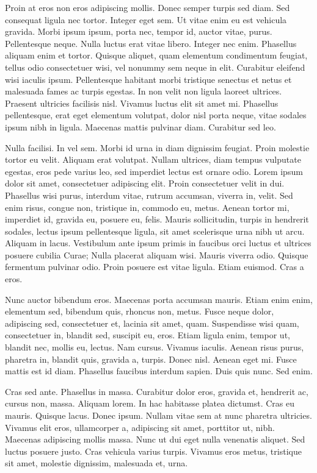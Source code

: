 Proin at eros non eros adipiscing mollis. Donec semper turpis sed diam. Sed consequat ligula nec tortor. Integer eget sem. Ut vitae enim eu est vehicula gravida. Morbi ipsum ipsum, porta nec, tempor id, auctor vitae, purus. Pellentesque neque. Nulla luctus erat vitae libero. Integer nec enim. Phasellus aliquam enim et tortor. Quisque aliquet, quam elementum condimentum feugiat, tellus odio consectetuer wisi, vel nonummy sem neque in elit. Curabitur eleifend wisi iaculis ipsum. Pellentesque habitant morbi tristique senectus et netus et malesuada fames ac turpis egestas. In non velit non ligula laoreet ultrices. Praesent ultricies facilisis nisl. Vivamus luctus elit sit amet mi. Phasellus pellentesque, erat eget elementum volutpat, dolor nisl porta neque, vitae sodales ipsum nibh in ligula. Maecenas mattis pulvinar diam. Curabitur sed leo.

Nulla facilisi. In vel sem. Morbi id urna in diam dignissim feugiat. Proin molestie tortor eu velit. Aliquam erat volutpat. Nullam ultrices, diam tempus vulputate egestas, eros pede varius leo, sed imperdiet lectus est ornare odio. Lorem ipsum dolor sit amet, consectetuer adipiscing elit. Proin consectetuer velit in dui. Phasellus wisi purus, interdum vitae, rutrum accumsan, viverra in, velit. Sed enim risus, congue non, tristique in, commodo eu, metus. Aenean tortor mi, imperdiet id, gravida eu, posuere eu, felis. Mauris sollicitudin, turpis in hendrerit sodales, lectus ipsum pellentesque ligula, sit amet scelerisque urna nibh ut arcu. Aliquam in lacus. Vestibulum ante ipsum primis in faucibus orci luctus et ultrices posuere cubilia Curae; Nulla placerat aliquam wisi. Mauris viverra odio. Quisque fermentum pulvinar odio. Proin posuere est vitae ligula. Etiam euismod. Cras a eros.

Nunc auctor bibendum eros. Maecenas porta accumsan mauris. Etiam enim enim, elementum sed, bibendum quis, rhoncus non, metus. Fusce neque dolor, adipiscing sed, consectetuer et, lacinia sit amet, quam. Suspendisse wisi quam, consectetuer in, blandit sed, suscipit eu, eros. Etiam ligula enim, tempor ut, blandit nec, mollis eu, lectus. Nam cursus. Vivamus iaculis. Aenean risus purus, pharetra in, blandit quis, gravida a, turpis. Donec nisl. Aenean eget mi. Fusce mattis est id diam. Phasellus faucibus interdum sapien. Duis quis nunc. Sed enim.


Cras sed ante. Phasellus in massa. Curabitur dolor eros, gravida et, hendrerit ac, cursus non, massa. Aliquam lorem. In hac habitasse platea dictumst. Cras eu mauris. Quisque lacus. Donec ipsum. Nullam vitae sem at nunc pharetra ultricies. Vivamus elit eros, ullamcorper a, adipiscing sit amet, porttitor ut, nibh. Maecenas adipiscing mollis massa. Nunc ut dui eget nulla venenatis aliquet. Sed luctus posuere justo. Cras vehicula varius turpis. Vivamus eros metus, tristique sit amet, molestie dignissim, malesuada et, urna.


